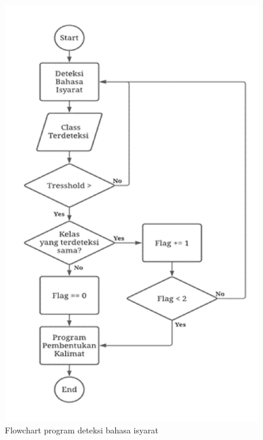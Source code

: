 \begin{figure}[H]
  \centering

  \includegraphics[scale=0.3]{gambar/bab3-flowchart-deteksi.png}

  \caption{Flowchart program deteksi bahasa isyarat}
  \label{fig:flowchartdeteksi}
\end{figure}

